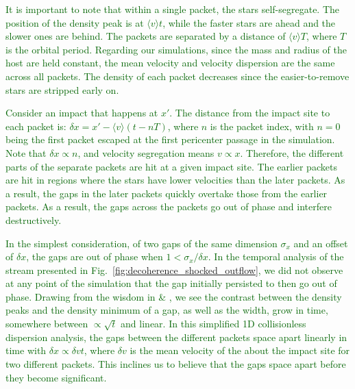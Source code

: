 \documentclass{aa}
\newcommand{\salvatore}[1]{\textcolor{darkgreen}{{#1}}}
\begin{document}
\begin{appendix}
\salvatore{It is important to note that within a single packet, the stars self-segregate. The position of the density peak is at $\langle v \rangle t$, while the faster stars are ahead and the slower ones are behind. The packets are separated by a distance of $\langle  v\rangle T$, where $T$ is the orbital period. Regarding our simulations, since the mass and radius of the host are held constant, the mean velocity and velocity dispersion are the same across all packets. The density of each packet decreases since the easier-to-remove stars are stripped early on. }

\salvatore{Consider an impact that happens at $x\prime$. The distance from the impact site to each packet is: $\delta x= x\prime - \langle v\rangle \left(t-n T\right)$, where $n$ is the packet index, with $n=0$ being the first packet escaped at the first pericenter passage in the simulation. Note that $\delta x\propto n$, and velocity segregation means $v\propto x$. Therefore, the different parts of the separate packets are hit at a given impact site. The earlier packets are hit in regions where the stars have lower velocities than the later packets. As a result, the gaps in the later packets quickly overtake those from the earlier packets. As a result, the gaps across the packets go out of phase and interfere destructively.}

\salvatore{In the simplest consideration, of two gaps of the same dimension $\sigma_x$ and an offset of $\delta x$, the gaps are out of phase when $1<\sigma_x/\delta x$. In the temporal analysis of the stream presented in Fig.~\ref{fig:decoherence_shocked_outflow}, we did not observe at any point of the simulation that the gap initially persisted to then go out of phase. Drawing from the wisdom in \citet{2015MNRAS.450.1136E} \& \citet{2016MNRAS.457.3817S}, we see the contrast between the density peaks and the density minimum of a gap, as well as the width, grow in time, somewhere between $\propto \sqrt{t}$ and linear. In this simplified 1D collisionless dispersion analysis, the gaps between the different packets space apart linearly in time with $\delta x\propto \delta vt$, where $\delta v$ is the mean velocity of the about the impact site for two different packets. This inclines us to believe that the gaps space apart before they become significant. }


\end{appendix}
\end{document}
